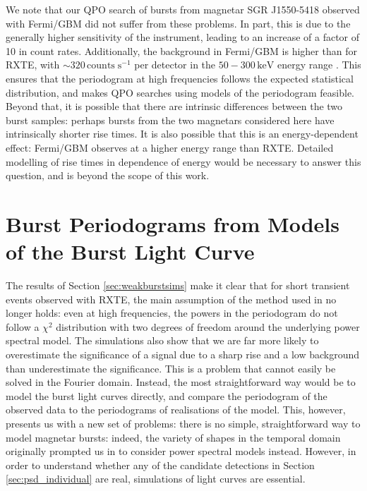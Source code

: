 \documentclass[numberedappendix]{emulateapj}
\begin{document}
We note that our QPO search of bursts from magnetar SGR J1550-5418 observed with Fermi/GBM did not suffer from these problems. In part, this is due to the generally higher sensitivity of the instrument, leading to an increase of a factor of 10 in count rates. Additionally, the background in Fermi/GBM is higher than for RXTE, with $\sim 320 \, \mathrm{counts} \; \mathrm{s}^{-1}$ per detector in the $50 - 300 \, \mathrm{keV}$ energy range \citep{meegan2009}. This ensures that the periodogram at high frequencies follows the expected statistical distribution, and makes QPO searches using models of the periodogram feasible. Beyond that, it is possible that there are intrinsic differences between the two burst samples: perhaps bursts from the two magnetars considered here have intrinsically shorter rise times. It is also possible that this is an energy-dependent effect: Fermi/GBM observes at a higher energy range than RXTE. Detailed modelling of rise times in dependence of energy would be necessary to answer this question, and is beyond the scope of this work.


\section{Burst Periodograms from Models of the Burst Light Curve}
\label{sec:dnest}

The results of Section \ref{sec:weakburstsims} make it clear that for short transient events observed with RXTE, the main assumption of the method used in \citet{huppenkothen2013} no longer holds: even at high frequencies, the powers in the periodogram do not follow a $\chi^2$ distribution with two degrees of freedom around the underlying power spectral model. The simulations also show that we are far more likely to overestimate the significance of a signal due to a sharp rise and a low background than underestimate the significance. This is a problem that cannot easily be solved in the Fourier domain. Instead, the most straightforward way would be to model the burst light curves directly, and compare the periodogram of the observed data to the periodograms of realisations of the model. This, however, presents us with a new set of problems: there is no simple, straightforward way to model magnetar bursts: indeed, the variety of shapes in the temporal domain originally prompted us in \citet{huppenkothen2013} to consider power spectral models instead. However, in order to understand whether any of the candidate detections in Section \ref{sec:psd_individual} are real, simulations of light curves are essential. 
\end{document}

